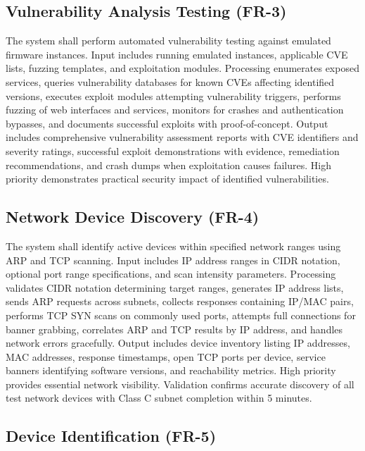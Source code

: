 \subsection{Vulnerability Analysis Testing (FR-3)}

The system shall perform automated vulnerability testing against emulated firmware instances. Input includes running emulated instances, applicable CVE lists, fuzzing templates, and exploitation modules. Processing enumerates exposed services, queries vulnerability databases for known CVEs affecting identified versions, executes exploit modules attempting vulnerability triggers, performs fuzzing of web interfaces and services, monitors for crashes and authentication bypasses, and documents successful exploits with proof-of-concept. Output includes comprehensive vulnerability assessment reports with CVE identifiers and severity ratings, successful exploit demonstrations with evidence, remediation recommendations, and crash dumps when exploitation causes failures. High priority demonstrates practical security impact of identified vulnerabilities.

\subsection{Network Device Discovery (FR-4)}

The system shall identify active devices within specified network ranges using ARP and TCP scanning. Input includes IP address ranges in CIDR notation, optional port range specifications, and scan intensity parameters. Processing validates CIDR notation determining target ranges, generates IP address lists, sends ARP requests across subnets, collects responses containing IP/MAC pairs, performs TCP SYN scans on commonly used ports, attempts full connections for banner grabbing, correlates ARP and TCP results by IP address, and handles network errors gracefully. Output includes device inventory listing IP addresses, MAC addresses, response timestamps, open TCP ports per device, service banners identifying software versions, and reachability metrics. High priority provides essential network visibility. Validation confirms accurate discovery of all test network devices with Class C subnet completion within 5 minutes.

\subsection{Device Identification (FR-5)}


